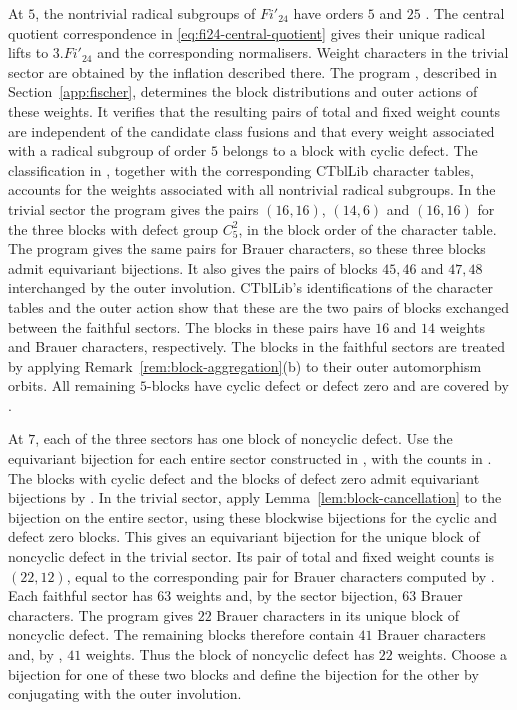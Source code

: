 \documentclass[10pt]{amsart}
\theoremstyle{definition}
\let\oldendproof\endproof
\renewenvironment{proof}[1][\proofname]{%
  \oldproof[\bfseries #1]%
}{\oldendproof}
\numberwithin{equation}{section}
\numberwithin{table}{section}
\begin{document}
\begin{proof}
At $5$, the nontrivial radical subgroups of $Fi'_{24}$ have orders
$5$ and $25$ \cite[Proposition~4.1 and Table~1]{AnCannonOBrienUngerFi24}.
The central quotient correspondence in
\eqref{eq:fi24-central-quotient} gives their unique radical lifts to
$3.Fi'_{24}$ and the corresponding normalisers. Weight characters in the
trivial sector are obtained by the inflation described there. The program , described in
Section~\ref{app:fischer}, determines the block distributions and outer
actions of these weights. It verifies that the resulting pairs of total and fixed weight counts are
independent of the candidate class fusions and that every weight associated
with a radical subgroup of order $5$ belongs to a block with cyclic defect. The classification in
\cite[Proposition~4.1 and Table~1]{AnCannonOBrienUngerFi24}, together
with the corresponding CTblLib character tables, accounts for the weights
associated with all nontrivial radical subgroups.  In the
trivial sector the program gives the pairs $(16,16)$, $(14,6)$ and
$(16,16)$ for the three blocks with defect group $C_5^2$, in the block
order of the character table. The program  gives the
same pairs for Brauer characters, so these three blocks admit
equivariant bijections. It also gives the
pairs of blocks $45,46$ and $47,48$ interchanged by the outer involution.
CTblLib's identifications of the character tables and the outer action show
that these are the two pairs of blocks exchanged between the faithful sectors. The blocks in these pairs have $16$ and
$14$ weights and Brauer characters, respectively. The blocks in the faithful sectors are
treated by applying Remark~\ref{rem:block-aggregation}\textup{(b)} to their outer
automorphism orbits.  All remaining $5$-blocks have cyclic defect or
defect zero and are covered by \cite[Proposition~6.2]{Spath2013}.

At $7$, each of the three sectors has one block of noncyclic defect.
Use the equivariant bijection for each entire sector constructed in
\cite[Section~4.3.4]{AnDietrich2012}, with the counts in \cite[Table~8]{AnDietrich2012}.  The blocks with cyclic defect
and the blocks of defect zero admit equivariant bijections by
\cite[Proposition~6.2]{Spath2013}.  In the trivial sector, apply
Lemma~\ref{lem:block-cancellation} to the bijection on the entire sector, using these
blockwise bijections for the cyclic and defect zero blocks.  This gives an
equivariant bijection for the unique block of noncyclic defect in the
trivial sector. Its pair of total and fixed weight counts is $(22,12)$, equal to the
corresponding pair for Brauer characters computed by .
Each faithful sector has $63$ weights and, by the sector bijection, $63$
Brauer characters. The program  gives $22$ Brauer
characters in its unique block of noncyclic defect. The remaining blocks
therefore contain $41$ Brauer characters and, by
\cite[Proposition~6.2]{Spath2013}, $41$ weights. Thus the block of
noncyclic defect has $22$ weights. Choose a bijection for one of these
two blocks and define the bijection for the other by conjugating with
the outer involution.


\end{proof}
\end{document}
